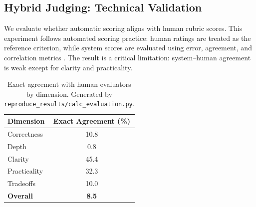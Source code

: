 ﻿\documentclass[final,3p,times,authoryear]{elsarticle}
\begin{document}
\subsection{Hybrid Judging: Technical Validation}
\label{sec:results_hybrid}

\noindent We evaluate whether automatic scoring aligns with human rubric scores. This experiment follows automated scoring practice: human ratings are treated as the reference criterion, while system scores are evaluated using error, agreement, and correlation metrics \cite{burrows2015eraser,llm_formative2025}. The result is a critical limitation: system--human agreement is weak except for clarity and practicality.

\begin{table}[H]
\centering
\caption{Exact agreement with human evaluators by dimension. Generated by \texttt{reproduce\_results/calc\_evaluation.py}.}
\label{tab:evaluation}
\begin{tabular}{lc}
\toprule
\textbf{Dimension} & \textbf{Exact Agreement (\%)} \\
\midrule
Correctness & 10.8 \\
Depth & 0.8 \\
Clarity & 45.4 \\
Practicality & 32.3 \\
Tradeoffs & 10.0 \\
\textbf{Overall} & \textbf{8.5} \\
\bottomrule
\end{tabular}
\end{table}

\begin{table}[H]
\centering
\caption{System-vs-human scoring validity. Generated by \texttt{calc\_extended\_experiments.py}.}
\label{tab:score_validity}
\end{table}
\end{document}

